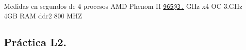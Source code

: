 Medidas en segundos de 4 procesos A\-M\-D Phenom I\-I \href{mailto:965@3.40}{\tt 965@3.} G\-Hz x4 O\-C 3.\-G\-Hz 4\-G\-B R\-A\-M ddr2 800 M\-H\-Z

\subsection*{Práctica L2.}